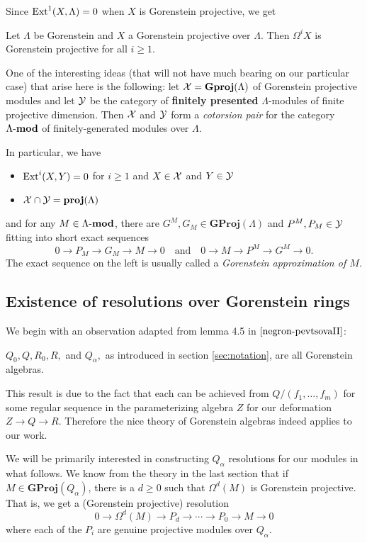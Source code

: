 \documentclass [11pt, proquest] {uwthesis}[2020/02/24]
\begin{document}
    Since $\operatorname{Ext}^1(X,\Lambda)=0$ when $X$ is Gorenstein projective, we get
    \begin{prop}
        Let $\Lambda$ be Gorenstein and $X$ a Gorenstein projective over $\Lambda.$ Then $\Omega^iX$ is Gorenstein projective for all $i\ge 1.$
    \end{prop}
    
    One of the interesting ideas (that will not have much bearing on our particular case) that arise here is the following: let $\mathcal{X}=\mathbf{Gproj}(\Lambda)$ of Gorenstein projective modules and let $\mathcal{Y}$ be the category of \textbf{finitely presented} $\Lambda$-modules of finite projective dimension. Then $\mathcal{X}$ and $\mathcal{Y}$ form a \textit{cotorsion pair} for the category $\Lambda\text{-}\mathbf{mod}$ of finitely-generated modules over $\Lambda.$
    
    In particular, we have
    \begin{itemize}
        \item $\operatorname{Ext}^i(X,Y)=0$ for $i\ge 1$ and $X\in\mathcal{X}$ and $Y\in\mathcal{Y}$
        \item $\mathcal{X}\cap\mathcal{Y}=\mathbf{proj}(\Lambda)$
    \end{itemize}
    and for any $M\in\Lambda\text{-}\mathbf{mod}$, there are $G^M,G_M\in\mathbf{GProj}(\Lambda)$ and $P^M,P_M\in\mathcal{Y}$
    fitting into short exact sequences
    \[0\to P_M\to G_M\to M\to 0\quad\text{and}\quad 0\to M\to P^M\to G^M\to 0.\]
    The exact sequence on the left is usually called a \textit{Gorenstein approximation of $M$.}

\subsection{Existence of resolutions over Gorenstein rings}\label{subsubsec:construction-of-res}
    We begin with an observation adapted from lemma 4.5 in $\cite{negron-pevtsovaII}$:
    \begin{cor}
        $Q_0,Q,R_0,R,$ and $Q_\alpha,$ as introduced in section \ref{sec:notation}, are all Gorenstein algebras. 
    \end{cor}
    This result is due to the fact that each can be achieved from $Q/(f_1,\dots,f_m)$ for some regular sequence in the parameterizing algebra $Z$ for our deformation $Z\to Q\to R.$ Therefore the nice theory of Gorenstein algebras indeed applies to our work.
    
    We will be primarily interested in constructing $Q_\alpha$ resolutions for our modules in what follows. We know from the theory in the last section that if $M\in\mathbf{GProj}(Q_\alpha)$, there is a $d\ge 0$ such that $\Omega^{d}(M)$ is Gorenstein projective. That is, we get a (Gorenstein projective) resolution
    \[0\to\Omega^d(M)\to P_d\to \cdots\to P_0\to M\to 0\]
    where each of the $P_i$ are genuine projective modules over $Q_\alpha$. 
    
\end{document}

